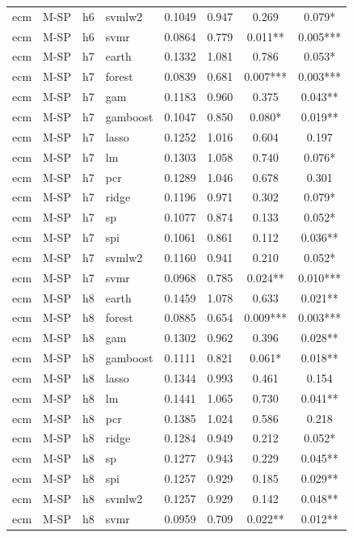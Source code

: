 \begin{ThreePartTable}
\begin{longtable}[t]{llclcccc}
ecm & M-SP & h6 & svmlw2 & 0.1049 & 0.947 & 0.269 & 0.079*\\
ecm & M-SP & h6 & svmr & 0.0864 & 0.779 & 0.011** & 0.005***\\
\addlinespace
ecm & M-SP & h7 & earth & 0.1332 & 1.081 & 0.786 & 0.053*\\
ecm & M-SP & h7 & forest & 0.0839 & 0.681 & 0.007*** & 0.003***\\
ecm & M-SP & h7 & gam & 0.1183 & 0.960 & 0.375 & 0.043**\\
ecm & M-SP & h7 & gamboost & 0.1047 & 0.850 & 0.080* & 0.019**\\
ecm & M-SP & h7 & lasso & 0.1252 & 1.016 & 0.604 & 0.197\\
ecm & M-SP & h7 & lm & 0.1303 & 1.058 & 0.740 & 0.076*\\
ecm & M-SP & h7 & pcr & 0.1289 & 1.046 & 0.678 & 0.301\\
ecm & M-SP & h7 & ridge & 0.1196 & 0.971 & 0.302 & 0.079*\\
ecm & M-SP & h7 & sp & 0.1077 & 0.874 & 0.133 & 0.052*\\
ecm & M-SP & h7 & spi & 0.1061 & 0.861 & 0.112 & 0.036**\\
ecm & M-SP & h7 & svmlw2 & 0.1160 & 0.941 & 0.210 & 0.052*\\
ecm & M-SP & h7 & svmr & 0.0968 & 0.785 & 0.024** & 0.010***\\
\addlinespace
ecm & M-SP & h8 & earth & 0.1459 & 1.078 & 0.633 & 0.021**\\
ecm & M-SP & h8 & forest & 0.0885 & 0.654 & 0.009*** & 0.003***\\
ecm & M-SP & h8 & gam & 0.1302 & 0.962 & 0.396 & 0.028**\\
ecm & M-SP & h8 & gamboost & 0.1111 & 0.821 & 0.061* & 0.018**\\
ecm & M-SP & h8 & lasso & 0.1344 & 0.993 & 0.461 & 0.154\\
ecm & M-SP & h8 & lm & 0.1441 & 1.065 & 0.730 & 0.041**\\
ecm & M-SP & h8 & pcr & 0.1385 & 1.024 & 0.586 & 0.218\\
ecm & M-SP & h8 & ridge & 0.1284 & 0.949 & 0.212 & 0.052*\\
ecm & M-SP & h8 & sp & 0.1277 & 0.943 & 0.229 & 0.045**\\
ecm & M-SP & h8 & spi & 0.1257 & 0.929 & 0.185 & 0.029**\\
ecm & M-SP & h8 & svmlw2 & 0.1257 & 0.929 & 0.142 & 0.048**\\
ecm & M-SP & h8 & svmr & 0.0959 & 0.709 & 0.022** & 0.012**\\

\end{longtable}
\end{ThreePartTable}
